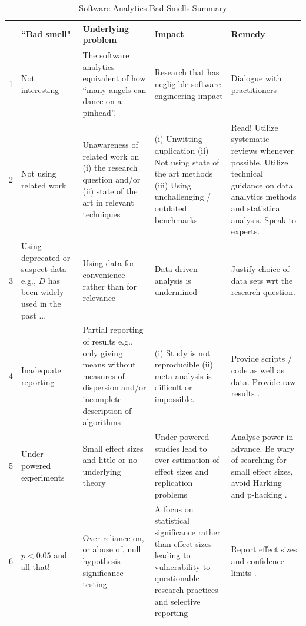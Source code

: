 \documentclass[preprint,10pt]{elsarticle}
\begin{document}
\begin{table}
\caption{Software Analytics Bad Smells Summary}
\scriptsize
\begin{center}
\begin{tabular}{|r|p{1.7cm}|p{2.3cm}|p{2.5cm}|p{3cm}|}
\hline
\rowcolor{gray!50}  & \textbf{``Bad smell"} & \textbf{Underlying problem} & \textbf{Impact} & \textbf{Remedy} \\
\hline
1 & Not interesting & The software analytics equivalent of how ``many angels can dance on a pinhead''. & Research that has negligible software engineering impact & Dialogue with practitioners \cite{Bege14,Lo2015,Ivar11} \\
\rowcolor{gray!50}2 & Not using related work & Unawareness of related work on (i) the research question and/or (ii) state of the art in relevant techniques & (i) Unwitting duplication (ii) Not using state of the art methods (iii) Using unchallenging / outdated benchmarks & Read! Utilize systematic reviews whenever possible. Utilize technical guidance on data analytics methods and statistical analysis. Speak to experts. \\
3 & Using deprecated or suspect data e.g., $D$ has been widely used in the past ... & Using data for convenience rather than for relevance & Data driven analysis is undermined \cite{agrawal18} & Justify choice of data sets wrt the research question. \\
\rowcolor{gray!50}4 & Inadequate
\newline reporting & Partial reporting of results e.g., only giving means without measures of dispersion and/or incomplete description of algorithms & (i) Study is not reproducible \cite{Made17} (ii) meta-analysis is difficult or impossible. & Provide scripts / code as well as data. Provide raw results \cite{Good16,Muna17}. \\
5 & Under-powered experiments & Small effect sizes and little or no underlying theory & Under-powered studies lead to over-estimation of effect sizes and replication problems & Analyse power in advance. Be wary of searching for small effect sizes, avoid Harking and p-hacking \cite{Butt13,Jorg16,Muna17}.\\
\rowcolor{gray!50}6 & $p<0.05$ and all that! & Over-reliance on, or abuse of, null hypothesis significance testing & A focus on statistical significance rather than effect sizes leading to vulnerability to questionable research practices and selective reporting \cite{Jorg16} & Report effect sizes and confidence limits \cite{Elli10,Lake14}. \\

\end{tabular}
\end{center}
\end{table}
\end{document}
